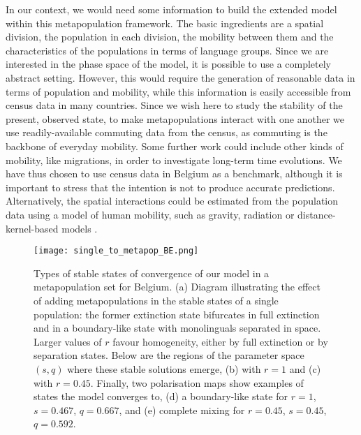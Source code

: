 \documentclass[../thesis.tex]{subfiles}
\begin{document}
In our context, we would need some information to build the extended model within this
metapopulation framework. The basic ingredients are a spatial division, the population
in each division, the mobility between them and the characteristics of the populations
in terms of language groups. Since we are interested in the phase space of the model, it
is possible to use a completely abstract setting. However, this would require the
generation of reasonable data in terms of population and mobility, while this
information is easily accessible from census data in many countries. Since we wish here
to study the stability of the present, observed state, to make metapopulations interact
with one another we use readily-available commuting data from the census, as commuting
is the backbone of everyday mobility. Some further work could include other kinds of
mobility, like migrations, in order to investigate long-term time evolutions. We have
thus chosen to use census data in Belgium as a benchmark, although it is important to
stress that the intention is not to produce accurate predictions. Alternatively, the
spatial interactions could be estimated from the population data using a model of human
mobility, such as gravity, radiation or distance-kernel-based models
\cite{BarbosaHumanMobility2018,BurridgeSpatialEvolution2017,BurridgeInferringDrivers2021}.

\begin{figure}[hp!]
  \centering
  \texttt{[image: single\_to\_metapop\_BE.png]}
  \caption{Types of stable states of convergence of our model in a metapopulation set
  for Belgium. (a) Diagram illustrating the effect of adding metapopulations in the
  stable states of a single population: the former extinction state bifurcates in full
  extinction and in a boundary-like state with monolinguals separated in space. Larger
  values of $r$ favour homogeneity, either by full extinction or by separation states.
  Below are the regions of the parameter space $(s,q)$ where these stable solutions
  emerge, (b) with $r=1$ and (c) with $r=0.45$. Finally, two polarisation maps show
  examples of states the model converges to, (d) a boundary-like state for $r=1$,
  $s=0.467$, $q=0.667$, and (e) complete mixing for $r=0.45$, $s=0.45$, $q=0.592$.}
  \label{fig:single_to_metapop_BE}
\end{figure}
\end{document}
